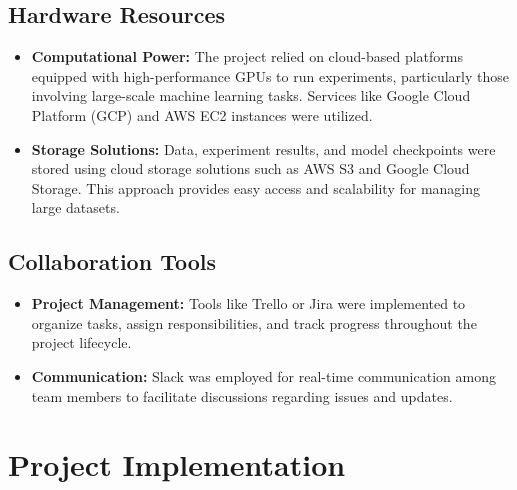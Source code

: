\subsection{Hardware Resources}
\begin{itemize}
    \item \textbf{Computational Power:} The project relied on cloud-based platforms equipped with high-performance GPUs to run experiments, particularly those involving large-scale machine learning tasks. Services like Google Cloud Platform (GCP) and AWS EC2 instances were utilized.
    
    \item \textbf{Storage Solutions:} Data, experiment results, and model checkpoints were stored using cloud storage solutions such as AWS S3 and Google Cloud Storage. This approach provides easy access and scalability for managing large datasets.
\end{itemize}

\subsection{Collaboration Tools}
\begin{itemize}
    \item \textbf{Project Management:} Tools like Trello or Jira were implemented to organize tasks, assign responsibilities, and track progress throughout the project lifecycle.
    
    \item \textbf{Communication:} Slack was employed for real-time communication among team members to facilitate discussions regarding issues and updates.
\end{itemize}

\section{Project Implementation}
